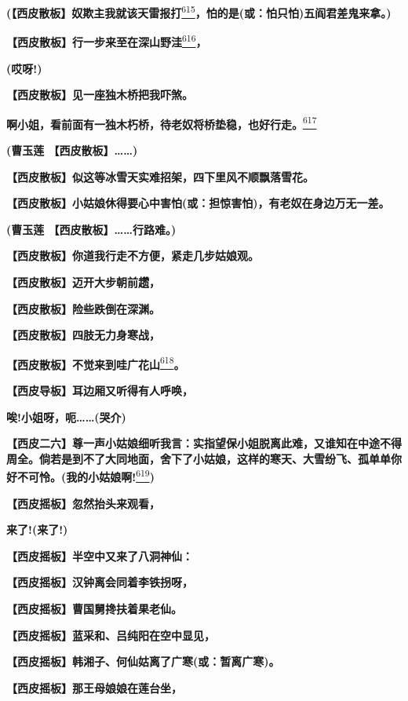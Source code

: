 \textbf{(【西皮散板】奴欺主我就该天雷报打}\protect\hyperlink{fn615}{\textsuperscript{615}}\textbf{，怕的是(或：怕只怕)五阎君差鬼来拿。)}

\textbf{【西皮散板】行一步来至在深山野洼}\protect\hyperlink{fn616}{\textsuperscript{616}}\textbf{，}

\textbf{(哎呀!)}

\textbf{【西皮散板】见一座独木桥把我吓煞。}

\textbf{啊小姐，看前面有一独木朽桥，待老奴将桥垫稳，也好行走。}\protect\hyperlink{fn617}{\textsuperscript{617}}

\textbf{(曹玉莲 【西皮散板】\ldots{}\ldots{})}

\textbf{【西皮散板】似这等冰雪天实难招架，四下里风不顺飘落雪花。}

\textbf{【西皮散板】小姑娘休得要心中害怕(或：担惊害怕)，有老奴在身边万无一差。}

\textbf{(曹玉莲 【西皮散板】\ldots{}\ldots{}行路难。)}

\textbf{【西皮散板】你道我行走不方便，紧走几步姑娘观。}

\textbf{【西皮散板】迈开大步朝前趱，}

\textbf{【西皮散板】险些跌倒在深渊。}

\textbf{【西皮散板】四肢无力身寒战，}

\textbf{【西皮散板】不觉来到哇广花山}\protect\hyperlink{fn618}{\textsuperscript{618}}\textbf{。}

\textbf{【西皮导板】耳边厢又听得有人呼唤，}

\textbf{唉!小姐呀，呃\ldots{}\ldots{}(哭介)}

\textbf{【西皮二六】尊一声小姑娘细听我言：实指望保小姐脱离此难，又谁知在中途不得周全。倘若是到不了大同地面，舍下了小姑娘，这样的寒天、大雪纷飞、孤单单你好不可怜。(我的小姑娘啊!}\protect\hyperlink{fn619}{\textsuperscript{619}}\textbf{)}

\textbf{【西皮摇板】忽然抬头来观看，}

\textbf{来了!(来了!)}

\textbf{【西皮摇板】半空中又来了八洞神仙：}

\textbf{【西皮摇板】汉钟离会同着李铁拐呀，}

\textbf{【西皮摇板】曹国舅搀扶着果老仙。}

\textbf{【西皮摇板】蓝采和、吕纯阳在空中显见，}

\textbf{【西皮摇板】韩湘子、何仙姑离了广寒(或：暂离广寒)。}

\textbf{【西皮摇板】那王母娘娘在莲台坐，}

